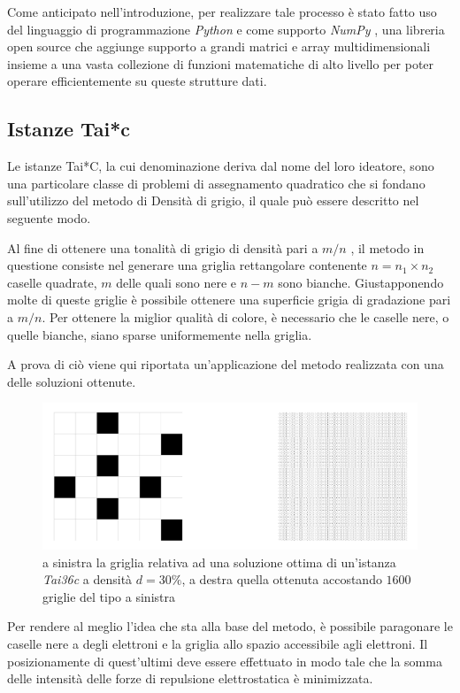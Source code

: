 Come anticipato nell'introduzione, per realizzare tale processo è stato fatto uso del linguaggio di programmazione \textit{Python} 
\cite{python} e come supporto \textit{NumPy} \cite{NumPy}, una libreria open source che aggiunge supporto a grandi matrici 
e array multidimensionali insieme a una vasta collezione di funzioni matematiche di alto livello per poter operare efficientemente 
su queste strutture dati.

\subsection{Istanze Tai*c}
Le istanze Tai*C, la cui denominazione deriva dal nome del loro ideatore, sono una particolare classe di problemi di assegnamento quadratico
che si fondano sull'utilizzo del metodo di Densità di grigio, il quale può essere descritto nel seguente modo.

Al fine di ottenere una tonalità di grigio di densità pari a $m/n$ , il metodo in questione consiste nel generare una griglia 
rettangolare contenente $n = n_1 \times n_2$ caselle quadrate, $m$ delle quali sono nere e $n-m$ sono bianche. 
Giustapponendo molte di queste griglie è possibile ottenere una superficie grigia di gradazione pari a $m/n$.
Per ottenere la miglior qualità di colore, è necessario che le caselle nere, o quelle bianche, siano sparse uniformemente nella griglia.

A prova di ciò viene qui riportata un'applicazione del metodo realizzata con una delle soluzioni ottenute.
\begin{figure}[h!]
    \centering
    \includegraphics[scale=0.21]{images/Density_of_Grey.png}
    \caption{a sinistra la griglia relativa ad una soluzione ottima di un'istanza \textit{Tai36c} a densità $d=30\%$, 
             \newline a destra quella ottenuta accostando $1600$ griglie del tipo a sinistra}
    \label{fig:dnsgry}
\end{figure}

Per rendere al meglio l'idea che sta alla base del metodo, è possibile paragonare le caselle nere a degli elettroni e la griglia 
allo spazio accessibile agli elettroni. Il posizionamente di quest'ultimi deve essere effettuato in modo tale che la somma delle 
intensità delle forze di repulsione elettrostatica è minimizzata.

